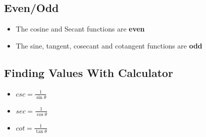 \documentclass{report}
\begin{document}
        \bigbreak \noindent \bigbreak \noindent 
        \subsection{Even/Odd}
        \begin{itemize}
          \item The cosine and Secant functions are \textbf{even}
          \item The sine, tangent, cosecant and cotangent functions are \textbf{odd}
        \end{itemize}

        \bigbreak \noindent \bigbreak \noindent 
        \subsection{
          Finding Values With Calculator
        }
        \begin{itemize}
         \item $csc = \frac{1}{\sin{\theta}} $
          \item $sec = \frac{1}{\cos{\theta }} $
          \item $cot = \frac{1}{\tan{\theta }} $
        \end{itemize}

        \bigbreak \noindent \bigbreak \noindent 
\end{document}
